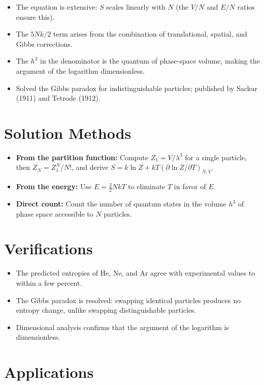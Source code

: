 \begin{itemize}
    \item The equation is extensive: $S$ scales linearly with $N$ (the $V/N$ and $E/N$ ratios ensure this).
    \item The $5Nk/2$ term arises from the combination of translational, spatial, and Gibbs corrections.
    \item The $h^3$ in the denominator is the quantum of phase-space volume, making the argument of the logarithm dimensionless.
    \item Solved the Gibbs paradox for indistinguishable particles; published by Sackur (1911) and Tetrode (1912).
\end{itemize}
\section*{Solution Methods}

\begin{itemize}
    \item \textbf{From the partition function:} Compute $Z_1 = V/\lambda^3$ for a single particle, then $Z_N = Z_1^N/N!$, and derive $S = k\ln Z + kT(\partial\ln Z/\partial T)_{N,V}$.
    \item \textbf{From the energy:} Use $E = \frac{3}{2}NkT$ to eliminate $T$ in favor of $E$.
    \item \textbf{Direct count:} Count the number of quantum states in the volume $h^3$ of phase space accessible to $N$ particles.
\end{itemize}
\section*{Verifications}

\begin{itemize}
    \item The predicted entropies of He, Ne, and Ar agree with experimental values to within a few percent.
    \item The Gibbs paradox is resolved: swapping identical particles produces no entropy change, unlike swapping distinguishable particles.
    \item Dimensional analysis confirms that the argument of the logarithm is dimensionless.
\end{itemize}
\section*{Applications}


